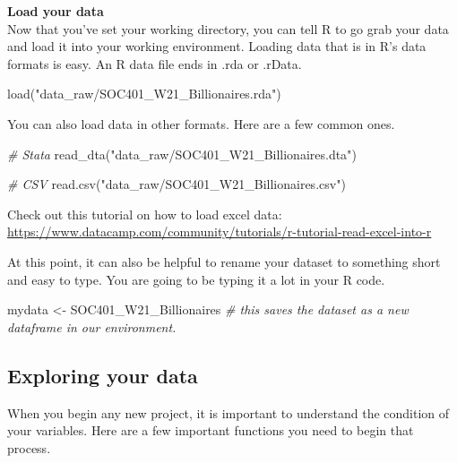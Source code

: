 \documentclass[
]{book}
\newenvironment{Shaded}{\begin{snugshade}}{\end{snugshade}}
\newcommand{\CommentTok}[1]{\textcolor[rgb]{0.56,0.35,0.01}{\textit{#1}}}
\newcommand{\FunctionTok}[1]{\textcolor[rgb]{0.00,0.00,0.00}{#1}}
\newcommand{\NormalTok}[1]{#1}
\newcommand{\OtherTok}[1]{\textcolor[rgb]{0.56,0.35,0.01}{#1}}
\newcommand{\StringTok}[1]{\textcolor[rgb]{0.31,0.60,0.02}{#1}}
\begin{document}
\textbf{Load your data}\\
Now that you've set your working directory, you can tell R to go grab your data and load it into your working environment.
Loading data that is in R's data formats is easy. An R data file ends in .rda or .rData.

\begin{Shaded}
\begin{Highlighting}[]
\FunctionTok{load}\NormalTok{(}\StringTok{"data\_raw/SOC401\_W21\_Billionaires.rda"}\NormalTok{)}
\end{Highlighting}
\end{Shaded}

You can also load data in other formats. Here are a few common ones.

\begin{Shaded}
\begin{Highlighting}[]
\CommentTok{\# Stata}
\FunctionTok{read\_dta}\NormalTok{(}\StringTok{"data\_raw/SOC401\_W21\_Billionaires.dta"}\NormalTok{)}

\CommentTok{\# CSV}
\FunctionTok{read.csv}\NormalTok{(}\StringTok{"data\_raw/SOC401\_W21\_Billionaires.csv"}\NormalTok{)}
\end{Highlighting}
\end{Shaded}

Check out this tutorial on how to load excel data:
\url{https://www.datacamp.com/community/tutorials/r-tutorial-read-excel-into-r}

At this point, it can also be helpful to rename your dataset to something short and easy to type. You are going to be typing it a lot in your R code.

\begin{Shaded}
\begin{Highlighting}[]
\NormalTok{mydata }\OtherTok{\textless{}{-}}\NormalTok{ SOC401\_W21\_Billionaires }\CommentTok{\# this saves the dataset as a new dataframe in our environment.}
\end{Highlighting}
\end{Shaded}

\hypertarget{exploring-your-data-1}{%
\subsection*{Exploring your data}\label{exploring-your-data-1}}

When you begin any new project, it is important to understand the condition of your variables. Here are a few important functions you need to begin that process.
\end{document}

